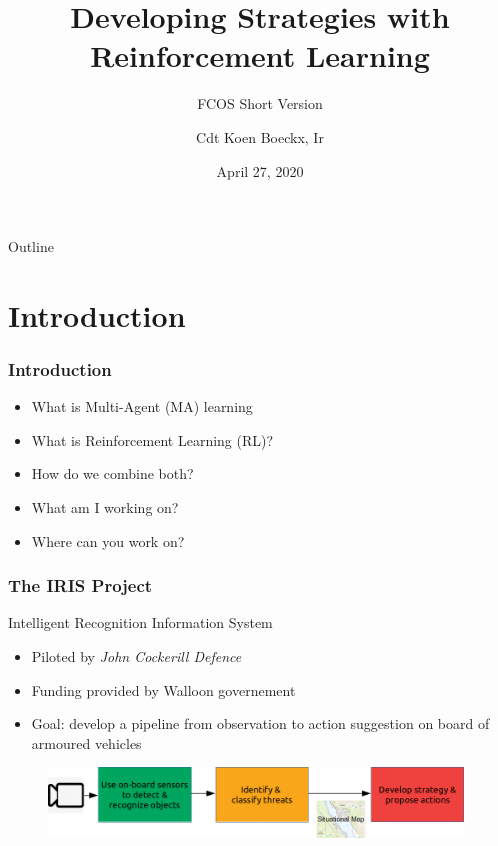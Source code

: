 \documentclass{beamer}
\title{Developing Strategies with Reinforcement Learning}
\subtitle{FCOS Short Version}
\author{Cdt Koen Boeckx, Ir}
\date{April 27, 2020}
\begin{document}
\begin{frame}
\titlepage
\end{frame}

\begin{frame}{Outline}
\tableofcontents
\end{frame}

\section{Introduction}
\begin{frame}
\frametitle{Introduction}
\begin{itemize}
    \item What is Multi-Agent (MA) learning
    \item What is Reinforcement Learning (RL)?
    \item How do we combine both?
    \item What am I working on?
    \item Where can you work on?
\end{itemize}
\end{frame}

\begin{frame}
\frametitle{The IRIS Project}
\begin{block}{Intelligent Recognition Information System}
\begin{itemize}
    \item Piloted by \emph{John Cockerill Defence}
    \item Funding provided by Walloon governement
    \item Goal: develop a pipeline from observation to action suggestion on board of armoured vehicles
\end{itemize}
\end{block}
\begin{figure}[htp]
    \centering
    \includegraphics[width=11cm]{images/IRIS_schematic.png}
\end{figure}
\end{frame}
\end{document}
